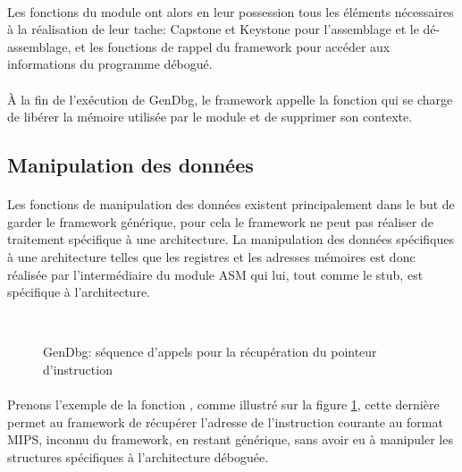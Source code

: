 \documentclass[11pt, book, english, french, standardlists]{upmethodology-document}
\begin{document}
				\paragraph*{}
					Les fonctions du module ont alors en leur possession tous les éléments nécessaires à la réalisation de leur tache: Capstone et Keystone pour l'assemblage et le dé-assemblage, et les fonctions de rappel du framework pour accéder aux informations du programme débogué.
				\paragraph*{}
					À la fin de l'exécution de GenDbg, le framework appelle la fonction  qui se charge de libérer la mémoire utilisée par le module et de supprimer son contexte.
			\subsection{Manipulation des données}
				\paragraph*{}
					Les fonctions de manipulation des données existent principalement dans le but de garder le framework générique, pour cela le framework ne peut pas réaliser de traitement spécifique à une architecture. La manipulation des données spécifiques à une architecture telles que les registres et les adresses mémoires est donc réalisée par l'intermédiaire du module ASM qui lui, tout comme le stub, est spécifique à l'architecture.
				\begin{figure}[H]
					\centering
					\\
					\vspace{5pt}
					\caption{GenDbg: séquence d'appels pour la récupération du pointeur d'instruction}
					\label{fig:GenDbg_sequence_GetInstructionPointer}
				\end{figure}
				\paragraph*{}
					Prenons l'exemple de la fonction , comme illustré sur la figure \ref{fig:GenDbg_sequence_GetInstructionPointer}, cette dernière permet au framework de récupérer l'adresse de l'instruction courante au format MIPS, inconnu du framework, en restant générique, sans avoir eu à manipuler les structures spécifiques à l'architecture déboguée.
\end{document}
